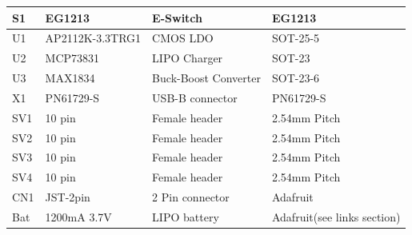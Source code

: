 \documentclass{article}
\begin{document}
\begin{center}
\begin{tabular}{ |m{2em}|m{7em}|m{7em}|m{7em}|}
	S1 & EG1213 & E-Switch & EG1213 \\ \hline
	U1 & AP2112K-3.3TRG1 & CMOS LDO & SOT-25-5 \\ \hline
	U2 & MCP73831 & LIPO Charger & SOT-23 \\ \hline
	U3 & MAX1834 & Buck-Boost Converter & SOT-23-6 \\ \hline
	X1 & PN61729-S & USB-B connector & PN61729-S \\ \hline
	SV1 & 10 pin & Female header & 2.54mm Pitch \\ \hline
	SV2 & 10 pin & Female header & 2.54mm Pitch \\ \hline
	SV3 & 10 pin & Female header & 2.54mm Pitch \\ \hline
	SV4 & 10 pin & Female header & 2.54mm Pitch \\ \hline
	CN1 & JST-2pin & 2 Pin connector & Adafruit \\ \hline
	
	Bat & 1200mA 3.7V & LIPO battery & Adafruit(see links section) \\ \hline
    \end{tabular}
     \end{center}
\end{document}
